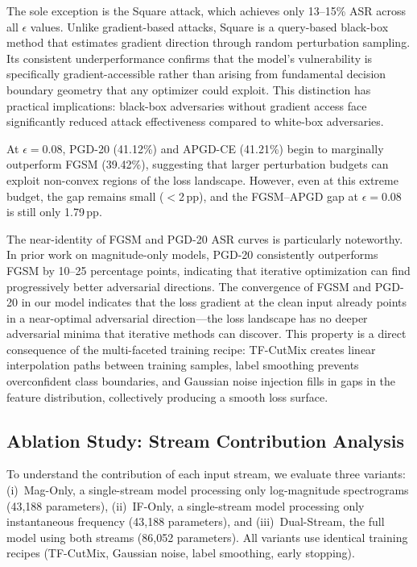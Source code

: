\documentclass[conference]{IEEEtran}
\begin{document}
The sole exception is the Square attack, which achieves only 13--15\% ASR across all $\epsilon$ values. Unlike gradient-based attacks, Square is a query-based black-box method that estimates gradient direction through random perturbation sampling. Its consistent underperformance confirms that the model's vulnerability is specifically gradient-accessible rather than arising from fundamental decision boundary geometry that any optimizer could exploit. This distinction has practical implications: black-box adversaries without gradient access face significantly reduced attack effectiveness compared to white-box adversaries.

At $\epsilon = 0.08$, PGD-20 (41.12\%) and APGD-CE (41.21\%) begin to marginally outperform FGSM (39.42\%), suggesting that larger perturbation budgets can exploit non-convex regions of the loss landscape. However, even at this extreme budget, the gap remains small ($<$2\,pp), and the FGSM--APGD gap at $\epsilon = 0.08$ is still only 1.79\,pp.

The near-identity of FGSM and PGD-20 ASR curves is particularly noteworthy. In prior work on magnitude-only models, PGD-20 consistently outperforms FGSM by 10--25 percentage points, indicating that iterative optimization can find progressively better adversarial directions. The convergence of FGSM and PGD-20 in our model indicates that the loss gradient at the clean input already points in a near-optimal adversarial direction---the loss landscape has no deeper adversarial minima that iterative methods can discover. This property is a direct consequence of the multi-faceted training recipe: TF-CutMix creates linear interpolation paths between training samples, label smoothing prevents overconfident class boundaries, and Gaussian noise injection fills in gaps in the feature distribution, collectively producing a smooth loss surface.

\subsection{Ablation Study: Stream Contribution Analysis}

To understand the contribution of each input stream, we evaluate three variants: (i)~Mag-Only, a single-stream model processing only log-magnitude spectrograms (43,188 parameters), (ii)~IF-Only, a single-stream model processing only instantaneous frequency (43,188 parameters), and (iii)~Dual-Stream, the full model using both streams (86,052 parameters). All variants use identical training recipes (TF-CutMix, Gaussian noise, label smoothing, early stopping).
\end{document}
